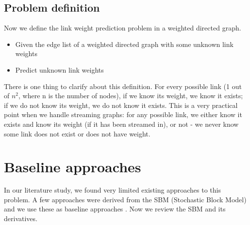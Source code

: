\documentclass[letterpaper]{article}
\begin{document}
\subsection{Problem definition}
Now we define the link weight prediction problem in a weighted directed graph.
\begin{itemize}
	\item Given the edge list of a weighted directed graph with some unknown link weights
	\item Predict unknown link weights
\end{itemize}
There is one thing to clarify about this definition.
For every possible link (1 out of $ n^2 $, where n is the number of nodes), 
if we know its weight, we know it exists;
if we do not know its weight, we do not know it exists.
This is a very practical point when we handle streaming graphs:
for any possible link,
we either know it exists and know its weight (if it has been streamed in), or not - we never know some link does not exist or does not have weight.

\section{Baseline approaches}
In our literature study, we found very limited existing approaches to this problem.
A few approaches were derived from the SBM (Stochastic Block Model) 
and we use these as baseline approaches \cite{aicher2014learning}.
Now we review the SBM and its derivatives.
\end{document}

